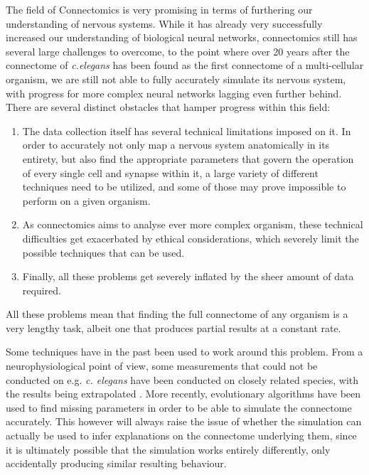 \documentclass[a4paper,11pt]{article}
\begin{document}
The field of Connectomics is very promising in terms of furthering our understanding of nervous systems. While it has already very successfully increased our understanding of biological neural networks, connectomics still has several large challenges to overcome, to the point where over 20 years after the connectome of \emph{c.elegans} has been found as the first connectome of a multi-cellular organism, we are still not able to fully accurately simulate its nervous system, with progress for more complex neural networks lagging even further behind. There are several distinct obstacles that hamper progress within this field:
\begin{enumerate}
\item The data collection itself has several technical limitations imposed on it. In order to accurately not only map a nervous system anatomically in its entirety, but also find the appropriate parameters that govern the operation of every single cell and synapse within it, a large variety of different techniques need to be utilized, and some of those may prove impossible to perform on a given organism. 
\item As connectomics aims to analyse ever more complex organism, these technical difficulties get exacerbated by ethical considerations, which severely limit the possible techniques that can be used.
\item Finally, all these problems get severely inflated by the sheer amount of data required.
\end{enumerate}

All these problems mean that finding the full connectome of any organism is a very lengthy task, albeit one that produces partial results at a constant rate. 

Some techniques have in the past been used to work around this problem. From a neurophysiological point of view, some measurements that could not be conducted on e.g. \emph{c. elegans} have been conducted on closely related species, with the results being extrapolated . More recently, evolutionary algorithms have been used to find missing parameters in order to be able to simulate the connectome accurately. This however will always raise the issue of whether the simulation can actually be used to infer explanations on the connectome underlying them, since it is ultimately possible that the simulation works entirely differently, only accidentally producing similar resulting behaviour. 
\end{document}
